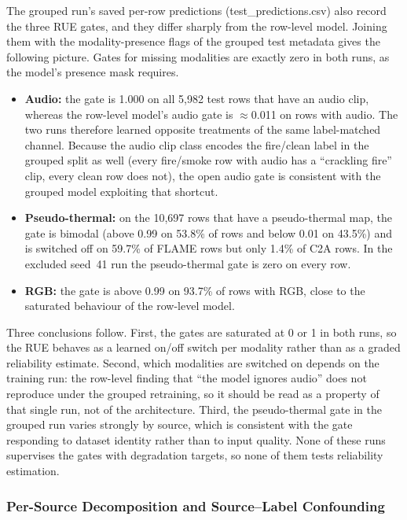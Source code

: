 \documentclass[journal]{IEEEtran}
\begin{document}
The grouped run's saved per-row predictions (test\_predictions.csv) also record the three RUE gates, and they differ sharply from the row-level model. Joining them with the modality-presence flags of the grouped test metadata gives the following picture. Gates for missing modalities are exactly zero in both runs, as the model's presence mask requires.
\begin{itemize}
    \item \textbf{Audio:} the gate is 1.000 on all 5{,}982 test rows that have an audio clip, whereas the row-level model's audio gate is $\approx$0.011 on rows with audio. The two runs therefore learned opposite treatments of the same label-matched channel. Because the audio clip class encodes the fire/clean label in the grouped split as well (every fire/smoke row with audio has a ``crackling fire'' clip, every clean row does not), the open audio gate is consistent with the grouped model exploiting that shortcut.
    \item \textbf{Pseudo-thermal:} on the 10{,}697 rows that have a pseudo-thermal map, the gate is bimodal (above 0.99 on 53.8\% of rows and below 0.01 on 43.5\%) and is switched off on 59.7\% of FLAME rows but only 1.4\% of C2A rows. In the excluded seed~41 run the pseudo-thermal gate is zero on every row.
    \item \textbf{RGB:} the gate is above 0.99 on 93.7\% of rows with RGB, close to the saturated behaviour of the row-level model.
\end{itemize}
Three conclusions follow. First, the gates are saturated at 0 or 1 in both runs, so the RUE behaves as a learned on/off switch per modality rather than as a graded reliability estimate. Second, which modalities are switched on depends on the training run: the row-level finding that ``the model ignores audio'' does not reproduce under the grouped retraining, so it should be read as a property of that single run, not of the architecture. Third, the pseudo-thermal gate in the grouped run varies strongly by source, which is consistent with the gate responding to dataset identity rather than to input quality. None of these runs supervises the gates with degradation targets, so none of them tests reliability estimation.

\subsubsection{Per-Source Decomposition and Source--Label Confounding}
\label{sec:per_source}
\end{document}
